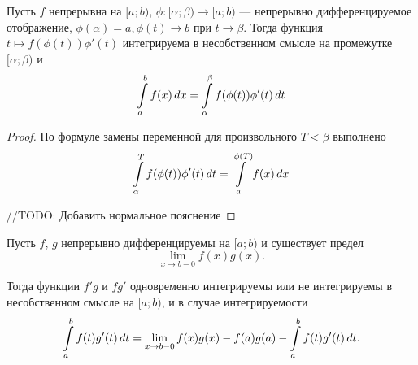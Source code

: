 \documentclass[a4paper]{article}
\theoremstyle{named}
\renewcommand{\int}{\intop}
\begin{document}
        \begin{theorem*}
            Пусть $f$ непрерывна на $[a; b)$, $\phi: [\alpha; \beta) \to [a; b)$ --- непрерывно дифференцируемое отображение, $\phi(\alpha) = a, \phi(t) \to b$ при $t \to \beta$. Тогда функция $t \mapsto f(\phi(t))\phi'(t)$ интегрируема в несобственном смысле на промежутке $[\alpha; \beta)$ и
            \begin{equation*}
                \int_a^b f(x) \dd x = \int_{\alpha}^{\beta} f(\phi(t))\phi'(t) \dd t
            \end{equation*}
        \end{theorem*}

        \begin{proof}
            По формуле замены переменной для произвольного $T < \beta$ выполнено
            \begin{equation*}
                \int_{\alpha}^T f(\phi(t))\phi'(t) \dd t = \int_a^{\phi(T)} f(x) \dd x
            \end{equation*}

            /\!/TODO: Добавить нормальное пояснение
        \end{proof}  

        \begin{theorem*}
            Пусть $f$, $g$ непрерывно дифференцируемы на $[a; b)$ и существует предел
            \begin{equation*}
                \lim_{x \to b - 0} f(x)g(x).
            \end{equation*}

            Тогда функции $f'g$ и $fg'$ одновременно интегрируемы или не интегрируемы в несобственном смысле на $[a; b)$, и в случае интегрируемости
            \begin{equation*}
                \int_a^b f(t)g'(t) \dd t = \lim_{x \to b - 0} f(x) g(x) - f(a)g(a) - \int_a^b f(t)g'(t) \dd t.
            \end{equation*}
        \end{theorem*}      
\end{document}
